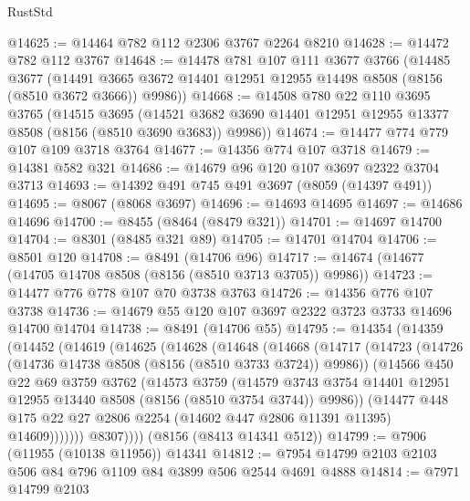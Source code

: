 \begin{lexlean}{RustStd}
\begin{coremodule}
@14625 := @14464 @782 @112 @2306 @3767 @2264 @8210
@14628 := @14472 @782 @112 @3767
@14648 := @14478
    @781
    @107
    @111
    @3677
    @3766
    (@14485
      @3677
      (@14491 @3665 @3672 @14401 @12951 @12955 @14498 @8508 (@8156 (@8510 @3672 @3666)) @9986))
@14668 := @14508
    @780
    @22
    @110
    @3695
    @3765
    (@14515
      @3695
      (@14521 @3682 @3690 @14401 @12951 @12955 @13377 @8508 (@8156 (@8510 @3690 @3683)) @9986))
@14674 := @14477 @774 @779 @107 @109 @3718 @3764
@14677 := @14356 @774 @107 @3718
@14679 := @14381 @582 @321
@14686 := @14679 @96 @120 @107 @3697 @2322 @3704 @3713
@14693 := @14392 @491 @745 @491 @3697 (@8059 (@14397 @491))
@14695 := @8067 (@8068 @3697)
@14696 := @14693 @14695
@14697 := @14686 @14696
@14700 := @8455 (@8464 (@8479 @321))
@14701 := @14697 @14700
@14704 := @8301 (@8485 @321 @89)
@14705 := @14701 @14704
@14706 := @8501 @120
@14708 := @8491 (@14706 @96)
@14717 := @14674 (@14677 (@14705 @14708 @8508 (@8156 (@8510 @3713 @3705)) @9986))
@14723 := @14477 @776 @778 @107 @70 @3738 @3763
@14726 := @14356 @776 @107 @3738
@14736 := @14679 @55 @120 @107 @3697 @2322 @3723 @3733 @14696 @14700 @14704
@14738 := @8491 (@14706 @55)
@14795 := @14354
    (@14359
      (@14452
        (@14619
          (@14625
            (@14628
              (@14648
                (@14668
                  (@14717
                    (@14723
                      (@14726 (@14736 @14738 @8508 (@8156 (@8510 @3733 @3724)) @9986))
                      (@14566
                        @450
                        @22
                        @69
                        @3759
                        @3762
                        (@14573
                          @3759
                          (@14579
                            @3743
                            @3754
                            @14401
                            @12951
                            @12955
                            @13440
                            @8508
                            (@8156 (@8510 @3754 @3744))
                            @9986))
                        (@14477
                          @448
                          @175
                          @22
                          @27
                          @2806
                          @2254
                          (@14602 @447 @2806 @11391 @11395)
                          @14609)))))))
            @8307))))
    (@8156 (@8413 @14341 @512))
@14799 := @7906 (@11955 (@10138 @11956)) @14341
@14812 := @7954 @14799 @2103 @2103 @506 @84 @796 @1109 @84 @3899 @506 @2544 @4691 @4888
@14814 := @7971 @14799 @2103

\end{coremodule}
\end{lexlean}
